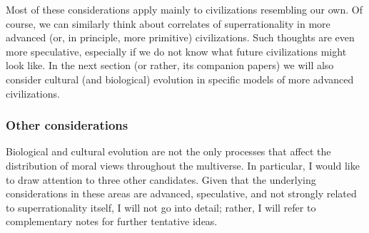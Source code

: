 Most of these considerations apply mainly to civilizations resembling
our own. Of course, we can similarly think about correlates of
superrationality in more advanced (or, in principle, more primitive)
civilizations. Such thoughts are even more speculative, especially if we
do not know what future civilizations might look like. In the next
section (or rather, its companion papers) we will also consider cultural
(and biological) evolution in specific models of more advanced
civilizations.

\hypertarget{other-considerations}{\subsubsection{Other
considerations}\label{other-considerations}}

Biological and cultural evolution are not the only processes that affect
the distribution of moral views throughout the multiverse. In
particular, I would like to draw attention to three other candidates.
Given that the underlying considerations in these areas are advanced,
speculative, and not strongly related to superrationality itself, I will
not go into detail; rather, I will refer to complementary notes for
further tentative ideas.

